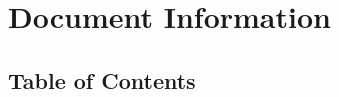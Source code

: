 \documentclass[a4paper,12pt,twoside]{article}
\begin{document}

\setcounter{section}{-1}
\section{Document Information}


\newpage
\subsection{Table of Contents}
\tableofcontents
\newpage

\newpage

\newpage

%
\end{document}
